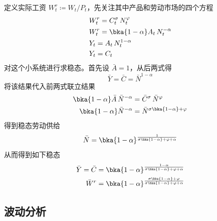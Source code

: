 定义实际工资 \(W^r_t\coloneq W_t/P_t\)，先关注其中产品和劳动市场的四个方程
\begin{align}
    & W^r_t=C_t^\sigma\,N^\varphi_t \label{eq:CMM-equilibrium-1}\\
    & W^r_t=\bka{1-\alpha}A_t\,N^{-\alpha}_t\\
    & Y_t=A_t\,N^{1-\alpha}_t \\
    & Y_t=C_t \label{eq:CMM-equilibrium-4}
\end{align}
对这个小系统进行求稳态。首先设 \(\bar A=1\)，从后两式得
\begin{equation*}
    \bar Y=\bar C=\bar N^{1-\alpha}
\end{equation*}
将该结果代入前两式联立结果
\begin{align*}
    \bka{1-\alpha}\bar A\,\bar N^{-\alpha}&=\bar C^\sigma\,\bar N^{\varphi}\\
    \bka{1-\alpha}\bar N^{-\alpha}&=\bar N^{\sigma\bka{1-\alpha}+\varphi}
\end{align*}
得到稳态劳动供给
\begin{equation*}
    \bar N=\bka{1-\alpha}^{\frac1{\sigma\bka{1-\alpha}+\varphi+\alpha}}
\end{equation*}
从而得到如下稳态
\begin{align*}
    \bar Y=\bar C&=\bka{1-\alpha}^{\frac{1-\alpha}{\sigma\bka{1-\alpha}+\varphi+\alpha}}\\
    \bar W^r&=\bka{1-\alpha}^{\frac{\sigma\bka{1-\alpha}+\varphi}{\sigma\bka{1-\alpha}+\varphi+\alpha}}
\end{align*}

\subsection{波动分析}\label{sec:CMM-fluctuation}


